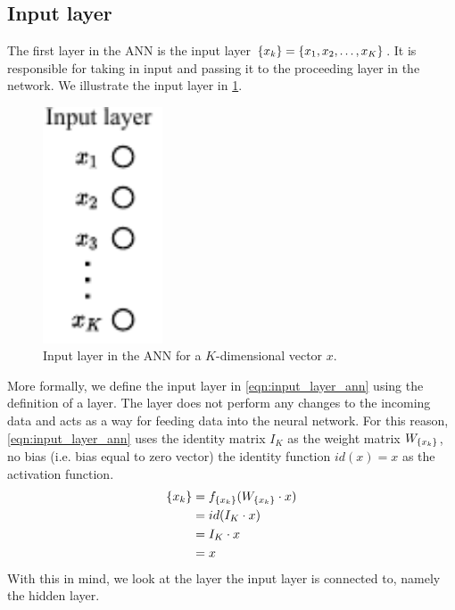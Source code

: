 \subsection{Input layer}
\label{sec:ann-input-layer}
The first layer in the ANN is the input layer $\left\{ {x}_{k} \right\} = \left\{ x_1, x_2, \ldots, x_K \right\}$. It is responsible for taking in input and passing it to the proceeding layer in the network. We illustrate the input layer in \cref{fig:input_layer_ann}.

\begin{figure}[H]
    \centering
    \includegraphics[height=7cm]{thesis/figures/artificial-neural-network-input-layer_cropped.pdf}
    \caption{Input layer in the ANN for a $K$-dimensional vector $x$.}
    \label{fig:input_layer_ann}
\end{figure}

More formally, we define the input layer in \cref{eqn:input_layer_ann} using the definition of a layer. The layer does not perform any changes to the incoming data and acts as a way for feeding data into the neural network. For this reason, \cref{eqn:input_layer_ann} uses the identity matrix $I_K$ as the weight matrix $W_{\left\{ {x}_{k} \right\}}$, no bias (i.e. bias equal to zero vector) the identity function $id(x)=x$ as the activation function.
\begin{align}
    \label{eqn:input_layer_ann}
    \left\{ {x}_{k} \right\}
    &= f_{\left\{ {x}_{k} \right\}}(W_{\left\{ {x}_{k} \right\}} \cdot x) \\
    &= id(I_K \cdot x) \\
    &= I_K \cdot x \\
    &= x
\end{align}
With this in mind, we look at the layer the input layer is connected to, namely the hidden layer.

